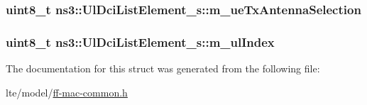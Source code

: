 \subsubsection[{\texorpdfstring{m\+\_\+ue\+Tx\+Antenna\+Selection}{m_ueTxAntennaSelection}}]{\setlength{\rightskip}{0pt plus 5cm}uint8\+\_\+t ns3\+::\+Ul\+Dci\+List\+Element\+\_\+s\+::m\+\_\+ue\+Tx\+Antenna\+Selection}\hypertarget{structns3_1_1UlDciListElement__s_a785073dd1af4aa97436b70c6a8833d2b}{}\label{structns3_1_1UlDciListElement__s_a785073dd1af4aa97436b70c6a8833d2b}
\subsubsection[{\texorpdfstring{m\+\_\+ul\+Index}{m_ulIndex}}]{\setlength{\rightskip}{0pt plus 5cm}uint8\+\_\+t ns3\+::\+Ul\+Dci\+List\+Element\+\_\+s\+::m\+\_\+ul\+Index}\hypertarget{structns3_1_1UlDciListElement__s_a31ce874554106bb25ba2b238e1002304}{}\label{structns3_1_1UlDciListElement__s_a31ce874554106bb25ba2b238e1002304}


The documentation for this struct was generated from the following file\+:\begin{DoxyCompactItemize}
\item 
lte/model/\hyperlink{ff-mac-common_8h}{ff-\/mac-\/common.\+h}\end{DoxyCompactItemize}
